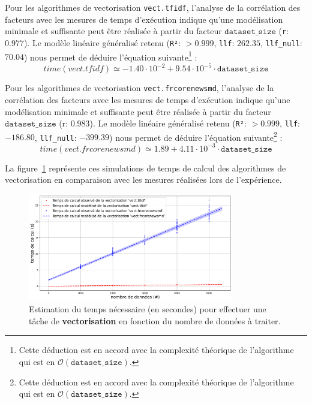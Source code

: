 			Pour les algorithmes de vectorisation \texttt{vect.tfidf}, l'analyse de la corrélation des facteurs avec les mesures de temps d'exécution indique qu'une modélisation minimale et suffisante peut être réalisée à partir du facteur $\texttt{dataset\_size}$ (\texttt{r}: $0.977$).
			Le modèle linéaire généralisé retenu (\texttt{R²}: $> 0.999$, \texttt{llf}: $262.35$, \texttt{llf\_null}: $70.04$) nous permet de déduire l'équation suivante\footnote{Cette déduction est en accord avec la complexité théorique de l'algorithme qui est en $ \mathcal{O}(\texttt{dataset\_size}) $.} :
			\begin{equation}
				time(vect.tfidf)
				\simeq -1.40\cdot10^{-2} + 9.54\cdot10^{-5}\cdot\texttt{dataset\_size}
			\end{equation}
			
			Pour les algorithmes de vectorisation \texttt{vect.frcorenewsmd}, l'analyse de la corrélation des facteurs avec les mesures de temps d'exécution indique qu'une modélisation minimale et suffisante peut être réalisée à partir du facteur $\texttt{dataset\_size}$ (r: $0.983$).
			Le modèle linéaire généralisé retenu (\texttt{R²}: $> 0.999$, \texttt{llf}: $-186.80$, \texttt{llf\_null}: $-399.39$) nous permet de déduire l'équation suivante\footnote{Cette déduction est en accord avec la complexité théorique de l'algorithme qui est en $ \mathcal{O}(\texttt{dataset\_size}) $.} :
			\begin{equation}
				time(vect.frcorenewsmd)
				\simeq 1.89 + 4.11\cdot10^{-3}\cdot\texttt{dataset\_size}
			\end{equation}
			
			La figure~\ref{figure:4.3.1-ETUDE-COUTS-TEMPS-CALCUL-MODELISATION-VECTORIZATION} représente ces simulations de temps de calcul des algorithmes de vectorisation en comparaison avec les mesures réalisées lors de l'expérience.
			\newline
			\begin{figure}[!htb]
				\centering
				\includegraphics[width=0.8\textwidth]{figures/etude-temps-calcul-modelisation-2vect}
				\caption{Estimation du temps nécessaire (en secondes) pour effectuer une tâche de \textbf{vectorisation} en fonction du nombre de données à traiter.}
				\label{figure:4.3.1-ETUDE-COUTS-TEMPS-CALCUL-MODELISATION-VECTORIZATION}
			\end{figure}
			
